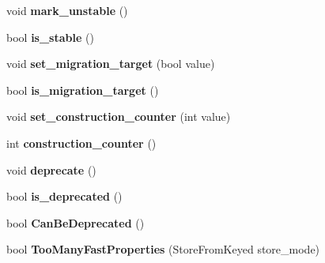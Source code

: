 \begin{DoxyCompactItemize}
\item 
void {\bfseries mark\+\_\+unstable} ()\hypertarget{classv8_1_1internal_1_1_map_ae4c34a731c5dcbe79b61c141385b78f2}{}\label{classv8_1_1internal_1_1_map_ae4c34a731c5dcbe79b61c141385b78f2}

\item 
bool {\bfseries is\+\_\+stable} ()\hypertarget{classv8_1_1internal_1_1_map_aff1ebc5e7fdd74fce42982006482a18c}{}\label{classv8_1_1internal_1_1_map_aff1ebc5e7fdd74fce42982006482a18c}

\item 
void {\bfseries set\+\_\+migration\+\_\+target} (bool value)\hypertarget{classv8_1_1internal_1_1_map_a0de7b99b64e1110dd7e0436d0b63fbf5}{}\label{classv8_1_1internal_1_1_map_a0de7b99b64e1110dd7e0436d0b63fbf5}

\item 
bool {\bfseries is\+\_\+migration\+\_\+target} ()\hypertarget{classv8_1_1internal_1_1_map_a748b187a2b07d12f03955897ea52fda3}{}\label{classv8_1_1internal_1_1_map_a748b187a2b07d12f03955897ea52fda3}

\item 
void {\bfseries set\+\_\+construction\+\_\+counter} (int value)\hypertarget{classv8_1_1internal_1_1_map_ae0a55f79fe939d333558e94c5b612876}{}\label{classv8_1_1internal_1_1_map_ae0a55f79fe939d333558e94c5b612876}

\item 
int {\bfseries construction\+\_\+counter} ()\hypertarget{classv8_1_1internal_1_1_map_a491d5e1d55d19d5aebc54a1184b49df3}{}\label{classv8_1_1internal_1_1_map_a491d5e1d55d19d5aebc54a1184b49df3}

\item 
void {\bfseries deprecate} ()\hypertarget{classv8_1_1internal_1_1_map_a17efd28bc74d90c77c570c12d620d847}{}\label{classv8_1_1internal_1_1_map_a17efd28bc74d90c77c570c12d620d847}

\item 
bool {\bfseries is\+\_\+deprecated} ()\hypertarget{classv8_1_1internal_1_1_map_ad7d030c80109577f03d009e70ea751b9}{}\label{classv8_1_1internal_1_1_map_ad7d030c80109577f03d009e70ea751b9}

\item 
bool {\bfseries Can\+Be\+Deprecated} ()\hypertarget{classv8_1_1internal_1_1_map_abcdce15461b5d4ade1c73944abdeb38d}{}\label{classv8_1_1internal_1_1_map_abcdce15461b5d4ade1c73944abdeb38d}

\item 
bool {\bfseries Too\+Many\+Fast\+Properties} (Store\+From\+Keyed store\+\_\+mode)\hypertarget{classv8_1_1internal_1_1_map_af3453cb7bd8c9b3c9c948d5ae212be86}{}\label{classv8_1_1internal_1_1_map_af3453cb7bd8c9b3c9c948d5ae212be86}


\end{DoxyCompactItemize}
